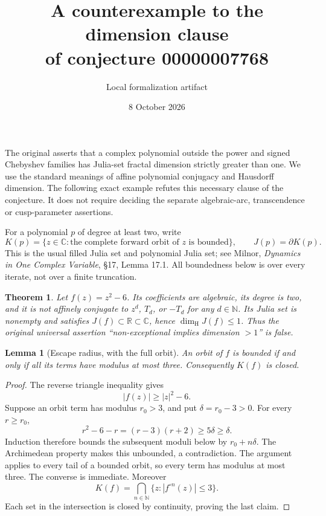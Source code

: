 \documentclass[11pt]{article}
\title{A counterexample to the dimension clause\protect\\of conjecture 00000007768}
\author{Local formalization artifact}
\date{8 October 2026}
\newtheorem{theorem}{Theorem}
\newtheorem{lemma}{Lemma}
\newcommand{\C}{\mathbb C}
\newcommand{\R}{\mathbb R}
\newcommand{\N}{\mathbb N}
\newcommand{\dimH}{\dim_{\mathrm H}}
\begin{document}
\maketitle

The original asserts that a complex polynomial outside the power and signed
Chebyshev families has Julia-set fractal dimension strictly greater than one.
We use the standard meanings of affine polynomial conjugacy and Hausdorff
dimension. The following exact example refutes this necessary clause of the
conjecture. It does not require deciding the separate algebraic-arc,
transcendence or cusp-parameter assertions.

For a polynomial $p$ of degree at least two, write
\[
 K(p)=\{z\in\C:\text{the complete forward orbit of }z\text{ is bounded}\},
 \qquad J(p)=\partial K(p).
\]
This is the usual filled Julia set and polynomial Julia set; see Milnor,
\emph{Dynamics in One Complex Variable}, \S17, Lemma 17.1. All boundedness below
is over every iterate, not over a finite truncation.

\begin{theorem}
Let $f(z)=z^2-6$. Its coefficients are algebraic, its degree is two, and it is
not affinely conjugate to $z^d$, $T_d$, or $-T_d$ for any $d\in\N$. Its Julia
set is nonempty and satisfies $J(f)\subset\R\subset\C$, hence
$\dimH J(f)\leq 1$. Thus the original universal assertion
``non-exceptional implies dimension $>1$'' is false.
\end{theorem}

\begin{lemma}[Escape radius, with the full orbit]
An orbit of $f$ is bounded if and only if all its terms have modulus at most
three. Consequently $K(f)$ is closed.
\end{lemma}
\begin{proof}
The reverse triangle inequality gives
\[
 |f(z)|\geq |z|^2-6.
\]
Suppose an orbit term has modulus $r_0>3$, and put $\delta=r_0-3>0$.
For every $r\geq r_0$,
\[
 r^2-6-r=(r-3)(r+2)\geq 5\delta\geq\delta.
\]
Induction therefore bounds the subsequent moduli below by $r_0+n\delta$.
The Archimedean property makes this unbounded, a contradiction. The argument
applies to every tail of a bounded orbit, so every term has modulus at most
three. The converse is immediate. Moreover
\[
 K(f)=\bigcap_{n\in\N}\{z:|f^{\circ n}(z)|\leq 3\}.
\]
Each set in the intersection is closed by continuity, proving the last claim.
\end{proof}
\end{document}
